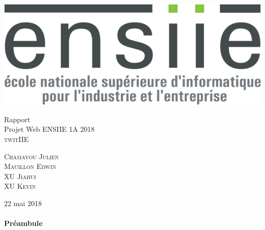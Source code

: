 \documentclass[a4paper, 12pt]{article}
\begin{document}
	\begin{titlepage}
			\includegraphics[scale=0.25]{Logo_transparent.png} 
			\begin{center}
				\vspace*{6cm}
				{ \huge Rapport \\
				Projet Web ENSIIE 1A 2018 \\
				\vspace*{1cm}
				\textsc{twitIIE}}
			\vspace*{3cm}
				\begin{center} \large
					\textsc{Chamayou} \textsc{Julien}\\
					\textsc{Mauillon} \textsc{Edwin}\\
					\textsc{XU} \textsc{Jiahui}\\
					\textsc{XU} \textsc{Kevin}		
				\end{center}
				\begin{minipage}{0.4\textwidth}
				
				\end{minipage}

				{\large 22 mai 2018}
			\end{center}
	\end{titlepage}


	\renewcommand{\contentsname}{Sommaire} 
	{\setlength{\baselineskip}{1.2\baselineskip}
\tableofcontents\par}
	
	\newpage
	\vspace*{3cm}
	\paragraph{\Huge{Préambule}}
\end{document}
